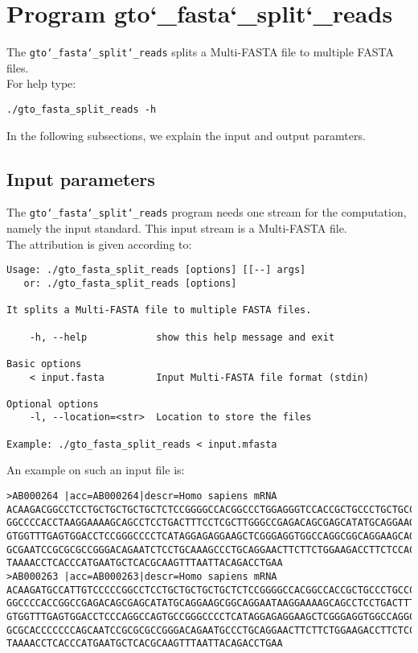 \section{Program gto\char`_fasta\char`_split\char`_reads}
The \texttt{gto\char`_fasta\char`_split\char`_reads} splits a Multi-FASTA file to multiple FASTA files.\\
For help type:
\begin{lstlisting}
./gto_fasta_split_reads -h
\end{lstlisting}
In the following subsections, we explain the input and output paramters.

\subsection*{Input parameters}

The \texttt{gto\char`_fasta\char`_split\char`_reads} program needs one stream for the computation, namely the input standard. This input stream is a Multi-FASTA file.\\
The attribution is given according to:
\begin{lstlisting}
Usage: ./gto_fasta_split_reads [options] [[--] args]
   or: ./gto_fasta_split_reads [options]

It splits a Multi-FASTA file to multiple FASTA files.

    -h, --help            show this help message and exit

Basic options
    < input.fasta         Input Multi-FASTA file format (stdin)

Optional options
    -l, --location=<str>  Location to store the files

Example: ./gto_fasta_split_reads < input.mfasta
\end{lstlisting}
An example on such an input file is:
\begin{lstlisting}
>AB000264 |acc=AB000264|descr=Homo sapiens mRNA 
ACAAGACGGCCTCCTGCTGCTGCTGCTCTCCGGGGCCACGGCCCTGGAGGGTCCACCGCTGCCCTGCTGCCATTGTCCCC
GGCCCCACCTAAGGAAAAGCAGCCTCCTGACTTTCCTCGCTTGGGCCGAGACAGCGAGCATATGCAGGAAGCGGCAGGAA
GTGGTTTGAGTGGACCTCCGGGCCCCTCATAGGAGAGGAAGCTCGGGAGGTGGCCAGGCGGCAGGAAGCAGGCCAGTGCC
GCGAATCCGCGCGCCGGGACAGAATCTCCTGCAAAGCCCTGCAGGAACTTCTTCTGGAAGACCTTCTCCACCCCCCCAGC
TAAAACCTCACCCATGAATGCTCACGCAAGTTTAATTACAGACCTGAA
>AB000263 |acc=AB000263|descr=Homo sapiens mRNA 
ACAAGATGCCATTGTCCCCCGGCCTCCTGCTGCTGCTGCTCTCCGGGGCCACGGCCACCGCTGCCCTGCCCCTGGAGGGT
GGCCCCACCGGCCGAGACAGCGAGCATATGCAGGAAGCGGCAGGAATAAGGAAAAGCAGCCTCCTGACTTTCCTCGCTTG
GTGGTTTGAGTGGACCTCCCAGGCCAGTGCCGGGCCCCTCATAGGAGAGGAAGCTCGGGAGGTGGCCAGGCGGCAGGAAG
GCGCACCCCCCCAGCAATCCGCGCGCCGGGACAGAATGCCCTGCAGGAACTTCTTCTGGAAGACCTTCTCCTCCTGCAAA
TAAAACCTCACCCATGAATGCTCACGCAAGTTTAATTACAGACCTGAA
\end{lstlisting}

